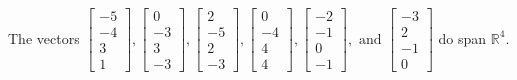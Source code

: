 \begin{exercise}
\begin{exerciseStatement}
  \end{exerciseStatement}
  \begin{exerciseAnswer}
   The vectors \(\left[\begin{array}{r}
-5 \\
-4 \\
3 \\
1
\end{array}\right] , \left[\begin{array}{r}
0 \\
-3 \\
3 \\
-3
\end{array}\right] , \left[\begin{array}{r}
2 \\
-5 \\
2 \\
-3
\end{array}\right] , \left[\begin{array}{r}
0 \\
-4 \\
4 \\
4
\end{array}\right] , \left[\begin{array}{r}
-2 \\
-1 \\
0 \\
-1
\end{array}\right] , \text{ and } \left[\begin{array}{r}
-3 \\
2 \\
-1 \\
0
\end{array}\right]\) 
  	 do  
	span \(\mathbb{R}^4\).
  


  \end{exerciseAnswer}
\end{exercise}